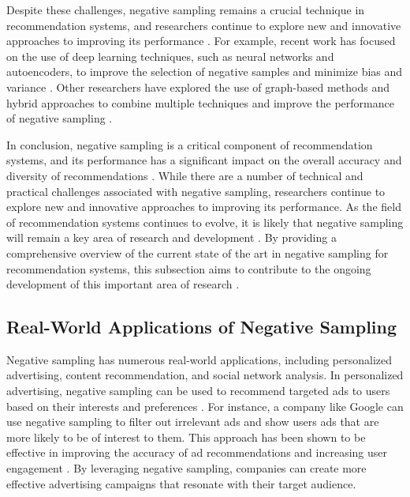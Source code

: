 \documentclass[11pt,a4paper]{article}
\begin{document}
Despite these challenges, negative sampling remains a crucial technique in recommendation systems, and researchers continue to explore new and innovative approaches to improving its performance \cite{doi:10.1007/s00521-022-08088-2}. For example, recent work has focused on the use of deep learning techniques, such as neural networks and autoencoders, to improve the selection of negative samples and minimize bias and variance \cite{doi:10.1109/access.2018.2869924}. Other researchers have explored the use of graph-based methods and hybrid approaches to combine multiple techniques and improve the performance of negative sampling \cite{doi:10.1007/978-1-0716-2197-4_2}.

In conclusion, negative sampling is a critical component of recommendation systems, and its performance has a significant impact on the overall accuracy and diversity of recommendations \cite{doi:10.1007/978-1-0716-2197-4_4}. While there are a number of technical and practical challenges associated with negative sampling, researchers continue to explore new and innovative approaches to improving its performance. As the field of recommendation systems continues to evolve, it is likely that negative sampling will remain a key area of research and development \cite{arxiv:2206.04415}. By providing a comprehensive overview of the current state of the art in negative sampling for recommendation systems, this subsection aims to contribute to the ongoing development of this important area of research \cite{arxiv:1608.07400}.


\subsection{Real-World Applications of Negative Sampling}


Negative sampling has numerous real-world applications, including personalized advertising, content recommendation, and social network analysis. In personalized advertising, negative sampling can be used to recommend targeted ads to users based on their interests and preferences \cite{arxiv:cs/0506075}. For instance, a company like Google can use negative sampling to filter out irrelevant ads and show users ads that are more likely to be of interest to them. This approach has been shown to be effective in improving the accuracy of ad recommendations and increasing user engagement \cite{doi:10.1155/2009/421425}. By leveraging negative sampling, companies can create more effective advertising campaigns that resonate with their target audience.
\end{document}
